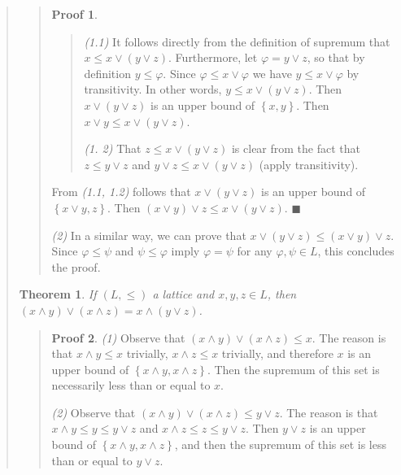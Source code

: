 \documentclass[a4paper, 12pt]{article}
\newtheorem{theorem}{Theorem}
\theoremstyle{definition}
\theoremstyle{definition}
\theoremstyle{definition}
\newtheorem{pro}{Proof}
\begin{document}
\begin{quote}
\begin{quote}
\begin{pro}
\begin{quote}

    \textit{(1.1)} It follows directly from the definition of supremum that $x
    \leq x \lor  (y \lor  z)$. Furthermore, let $\varphi = y \lor  z$, so that
    by definition $y \leq \varphi$. Since $\varphi \leq x \lor  \varphi$ we have
    $y \leq x \lor \varphi$ by transitivity. In other words, $y \leq x \lor  (y
    \lor  z)$. Then $x \lor  (y \lor  z)$ is an upper bound of $\left\{ x, y
    \right\} $. Then $x \lor y \leq x \lor  (y \lor  z)$.

    \textit{(1. 2)} That $z \leq x \lor  (y \lor  z)$ is clear from the fact
    that $z \leq y \lor  z$ and $y \lor  z \leq x \lor  (y \lor  z)$ (apply
    transitivity).

\end{quote}

From \textit{(1.1, 1.2)} follows that $x \lor (y \lor  z)$ is an upper bound of
$\left\{ x \lor  y, z \right\} $. Then $(x \lor  y) \lor  z \leq x \lor  (y \lor
z)$. $\blacksquare$

\textit{(2)} In a similar way, we can prove that $x \lor  (y \lor  z) \leq (x
\lor  y) \lor  z$. Since $\varphi \leq \psi$ and $\psi \leq \varphi$ imply
$\varphi = \psi$ for any $\varphi, \psi \in L$, this concludes the proof.

\end{pro}

\end{quote}
\normalsize


\begin{theorem}
    If $(L, \leq)$ a lattice and $x, y, z \in L$, then $(x \land y) \lor (x
    \land z) = x \land (y \lor  z)$. 
\end{theorem}


\small
\begin{quote}

    \begin{pro}
        
\textit{(1)} Observe that $(x \land  y) \lor   (x \land  z) \leq
x$. The reason is that $x \land  y \leq x $ trivially, $x \land  z \leq x$
trivially, and therefore $x$ is an upper bound of $\left\{ x \land  y, x \land
z\right\} $. Then the supremum of this set is necessarily less than or equal to
$x$.

\textit{(2)} Observe that $(x \land  y) \lor  (x \land z) \leq y \lor  z$. The
reason is that $x \land  y \leq y \leq y \lor  z$ and $x \land  z \leq  
z \leq y \lor  z$. Then $y \lor  z$ is an upper bound of $\left\{ x \land  y, x
\land  z\right\} $, and then the supremum of this set is less than or equal to
$y \lor  z$.


\end{pro}
\end{quote}
\end{quote}
\end{document}
